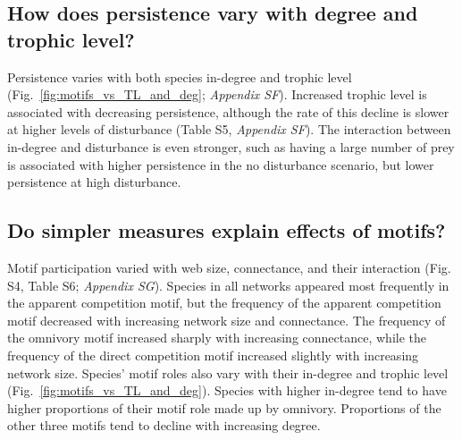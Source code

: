 \documentclass[12pt]{article}
\begin{document}
\begin{spacing}{2.0}
    \subsection*{How does persistence vary with degree and trophic level?}
    
        Persistence varies with both species in-degree and trophic level (Fig.~\ref{fig:motifs_vs_TL_and_deg}; \emph{Appendix SF}). Increased trophic level is associated with decreasing persistence, although the rate of this decline is slower at higher levels of disturbance (Table S5, \emph{Appendix SF}).
        The interaction between in-degree and disturbance is even stronger, such as having a large number of prey is associated with higher persistence in the no disturbance scenario, but lower persistence at high disturbance.
        
        
    
    \subsection*{Do simpler measures explain effects of motifs?}

        Motif participation varied with web size, connectance, and their interaction (Fig. S4, Table S6; \emph{Appendix SG}).
        Species in all networks appeared most frequently in the apparent competition motif, but the frequency of the apparent competition motif decreased with increasing network size and connectance.
        The frequency of the omnivory motif increased sharply with increasing connectance, while the frequency of the direct competition motif increased slightly with increasing network size. 
        Species' motif roles also vary with their in-degree and trophic level (Fig.~\ref{fig:motifs_vs_TL_and_deg}).
        Species with higher in-degree tend to have higher proportions of their motif role made up by omnivory. Proportions of the other three motifs tend to decline with increasing degree.
        

\end{spacing}
\end{document}
